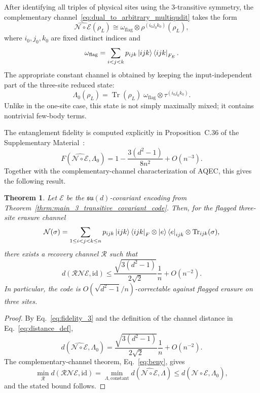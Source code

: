 \documentclass[10pt,twocolumn,superscriptaddress,aps,amsmath,amssymb,citeautoscript,floatfix,prx]{revtex4-2}
\newtheorem{theorem}{Theorem}
\theoremstyle{plain}
\theoremstyle{plain}
\theoremstyle{plain}
\theoremstyle{plain}
\theoremstyle{plain}
\theoremstyle{plain}
\begin{document}
After identifying all triples of physical sites using the $3$-transitive symmetry, the complementary channel~\eqref{eq:dual_to_arbitrary_multiqudit} takes the form
$$
\widehat{\mathcal N\circ\mathcal E}(\rho_L)
\cong
\omega_{\mathrm{flag}}
\otimes
\rho^{(i_0j_0k_0)}(\rho_L),
$$
where $i_0,j_0,k_0$ are fixed distinct indices and
$$
\omega_{\mathrm{flag}}
=
\sum_{i<j<k}
p_{ijk}
\ket{ijk}\bra{ijk}_{F_E}.
$$
The appropriate constant channel is obtained by keeping the input-independent part of the three-site reduced state:
$$
\Lambda_0(\rho_L)
=
\operatorname{Tr}(\rho_L)\;
\omega_{\mathrm{flag}}
\otimes
\tau^{(i_0j_0k_0)} .
$$
Unlike in the one-site case, this state is not simply maximally mixed; it contains nontrivial few-body terms.

The entanglement fidelity is computed explicitly in Proposition~C.36 of the Supplementary Material~\cite{SuppMat}:
\begin{equation}\label{eq:fidelity_3}
F\left(\widehat{\mathcal N\circ\mathcal E},\Lambda_0\right)
=
1
-
\frac{3(d^2-1)}{8n^2}
+
O(n^{-3}) .
\end{equation}
Together with the complementary-channel characterization of AQEC, this gives the following result.

\begin{theorem}
Let $\mathcal E$ be the $\mathfrak{su}(d)$-covariant encoding from Theorem~\ref{thrm:main_3_transitive_covariant_code}. Then, for the flagged three-site erasure channel
$$
\mathcal N(\sigma)
=
\sum_{1\le i<j<k\le n}
p_{ijk}
\ket{ijk}\bra{ijk}_F
\otimes
\ket e\bra e_{ijk}
\otimes
\operatorname{Tr}_{ijk}(\sigma),
$$
there exists a recovery channel $\mathcal R$ such that
$$
d(\mathcal R\mathcal N\mathcal E,\mathrm{id})
\le
\frac{\sqrt{3(d^2-1)}}{2\sqrt 2}
\frac1n
+
O(n^{-2}) .
$$
In particular, the code is $O(\sqrt{d^2-1}/n)$-correctable against flagged erasure on three sites.
\end{theorem}

\begin{proof}
By Eq.~\eqref{eq:fidelity_3} and the definition of the channel distance in Eq.~\eqref{eq:distance_def},
$$
d\left(\widehat{\mathcal N\circ\mathcal E},\Lambda_0\right)
=
\frac{\sqrt{3(d^2-1)}}{2\sqrt 2}
\frac1n
+
O(n^{-2}) .
$$
The complementary-channel theorem, Eq.~\eqref{eq:beny}, gives
$$
\min_{\mathcal R}
d(\mathcal R\mathcal N\mathcal E,\mathrm{id})
=
\min_{\Lambda,\mathrm{constant}}
d\left(\widehat{\mathcal N\circ\mathcal E},\Lambda\right)
\le
d\left(\widehat{\mathcal N\circ\mathcal E},\Lambda_0\right),
$$
and the stated bound follows.
\end{proof}
\end{document}

